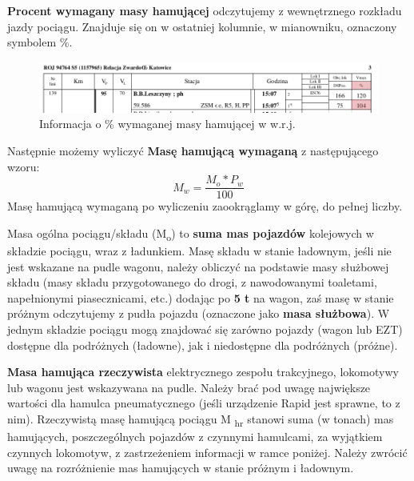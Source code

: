 \textbf{Procent wymagany masy hamującej} odczytujemy z wewnętrznego rozkładu jazdy pociągu. Znajduje się on w ostatniej kolumnie, w mianowniku, oznaczony symbolem \%. 
\begin{figure}
	\includegraphics[width=16cm]{skryptkierownik-img/skryptkierownik-img065.png}
	\caption{Informacja o \% wymaganej masy hamującej w w.r.j.}
	\label{fig:pw}
\end{figure}

Następnie możemy wyliczyć \textbf{Masę hamującą wymaganą} z następującego wzoru:
\[  M_{w}=\frac{M_{o}*P_{w}}{100} \label{wzr:mhw}  \]
Masę hamującą wymaganą po wyliczeniu zaookrąglamy w górę, do pełnej liczby.

Masa ogólna pociągu/składu (M\textsubscript{o}) to \textbf{suma mas pojazdów} kolejowych w składzie pociągu, wraz z ładunkiem. Masę składu w stanie ładownym, jeśli nie jest wskazane na pudle wagonu, należy obliczyć na podstawie masy służbowej składu (masy składu przygotowanego do drogi, z nawodowanymi toaletami, napełnionymi piasecznicami, etc.) dodając po \textbf{5 t} na wagon, zaś masę w stanie próżnym odczytujemy z pudła pojazdu (oznaczone jako \textbf{masa służbowa}). W jednym składzie pociągu mogą znajdować się zarówno pojazdy (wagon lub EZT) dostępne dla podróżnych (ładowne), jak i niedostępne dla podróżnych (próżne).

\textbf{Masa hamująca rzeczywista} elektrycznego zespołu trakcyjnego, lokomotywy lub wagonu jest wskazywana na pudle. Należy brać pod uwagę największe wartości dla hamulca pneumatycznego (jeśli urządzenie Rapid jest sprawne, to z nim). Rzeczywistą masę hamującą pociągu M\textsubscript{ hr} stanowi suma (w tonach) mas hamujących, poszczególnych pojazdów z czynnymi hamulcami, za wyjątkiem czynnych lokomotyw, z zastrzeżeniem informacji w ramce poniżej. Należy zwrócić uwagę na rozróżnienie mas hamujących w stanie próżnym i ładownym.

